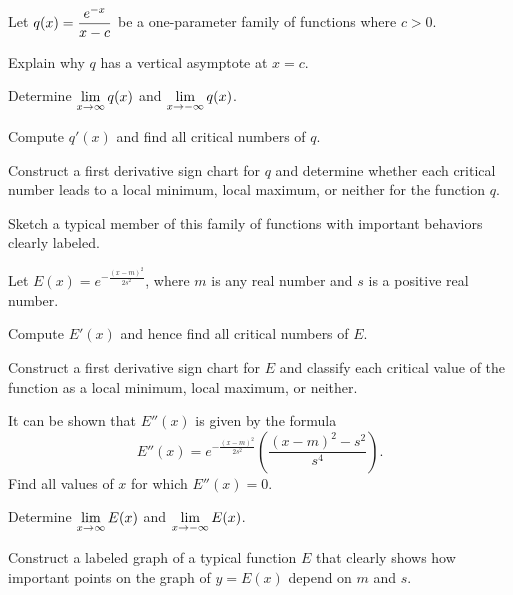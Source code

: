 \begin{exercises}
\item Let $q(x) = \displaystyle \frac{e^{-x}}{x-c}$ be a one-parameter family of functions where $c > 0$.
\ba
	\item Explain why $q$ has a vertical asymptote at $x = c$.
	\item Determine $\displaystyle \lim_{x \to \infty} q(x)$ and $\displaystyle \lim_{x \to -\infty} q(x)$.
	\item Compute $q'(x)$ and find all critical numbers of $q$.
	\item Construct a first derivative sign chart for $q$ and determine whether each critical number leads to a local minimum, local maximum, or neither for the function $q$.
	\item Sketch a typical member of this family of functions with important behaviors clearly labeled.
\ea
\item Let $E(x) = e^{-\frac{(x-m)^2}{2s^2}}$, where $m$ is any real number and $s$ is a positive real number.
\ba
	\item Compute $E'(x)$ and hence find all critical numbers of $E$.
	\item Construct a first derivative sign chart for $E$ and classify each critical value of the function as a local minimum, local maximum, or neither.
	\item It can be shown that $E''(x)$ is given by the formula
	$$E''(x) = e^{-\frac{(x-m)^2}{2s^2}} \left(\frac{(x-m)^2 - s^2}{s^4} \right).$$
	Find all values of $x$ for which $E''(x) = 0$.
	\item Determine $\displaystyle \lim_{x \to \infty} E(x)$ and $\displaystyle \lim_{x \to -\infty} E(x)$.
	\item Construct a labeled graph of a typical function $E$ that clearly shows how important points on the graph of $y = E(x)$ depend on $m$ and $s$.
\ea
\end{exercises}
\afterexercises
